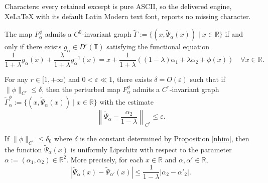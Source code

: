 \documentclass[10pt,a4paper]{amsart}
\newcommand{\R}{\mathbb{R}}
\newcommand{\al}{\alpha}
\newcommand{\eps}{\varepsilon}
\begin{document}
Characters: every retained excerpt is pure ASCII, so the delivered engine, XeLaTeX with its default Latin Modern text font, reports no missing character.
\begin{Proposition}\label{hf1}
The map $F^\phi_{\al}$ admits a $C^0$-invariant graph $\tilde{\Gamma} := \{(x, \tilde{\Psi}_{\alpha}(x)) \mid x \in \mathbb{R}\}$ if and only if there exists $g_{\alpha} \in D^r(\mathbb{T})$ satisfying the functional equation
\begin{equation}\tag{A}\label{eq:main}
\frac{1}{1+\lambda}g_{\alpha}(x) + \frac{\lambda}{1+\lambda}g_{\alpha}^{-1}(x) = x + \frac{1}{1+\lambda}\left((1-\lambda)\alpha_1 + \lambda\alpha_2 + \phi(x)\right) \quad \forall x \in \mathbb{R}.
\end{equation}
\end{Proposition}

\begin{Proposition}\label{nhim}
For any $r \in [1,+\infty)$ and $0 < \eps \ll 1$, there exists $\delta = O(\eps)$ such that if $\|\phi\|_{C^r} \leq \delta$, then the perturbed map $F^{\phi}_\alpha$ admits a $C^r$-invariant graph $\tilde{\Gamma}_\alpha^\phi := \{(x, \tilde{\Psi}_{\alpha}(x)) \mid x \in \mathbb{R}\}$ with the estimate
\[
\left\|\tilde{\Psi}_\alpha - \frac{\alpha_2}{1-\lambda}\right\|_{C^r} \leq \eps.
\]
\end{Proposition}

\begin{Proposition}\label{lipo}
 If $\|\phi\|_{C^1}\leq \delta_0$ where $\delta$ is the constant determined by Proposition \ref{nhim}, then the function $\tilde{\Psi}_\alpha(x)$ is uniformly Lipschitz with respect to the parameter $\alpha:=(\alpha_1,\alpha_2)\in \R^2$. More precisely, for each $x\in \R$ and $\al,{\al'}\in \R$,
\[|\tilde{\Psi}_\al(x)-\tilde{\Psi}_{\al'}(x)|\leq \frac{1}{1-\lambda}|\al_2-\al'_2|.\]
\end{Proposition}
\end{document}
